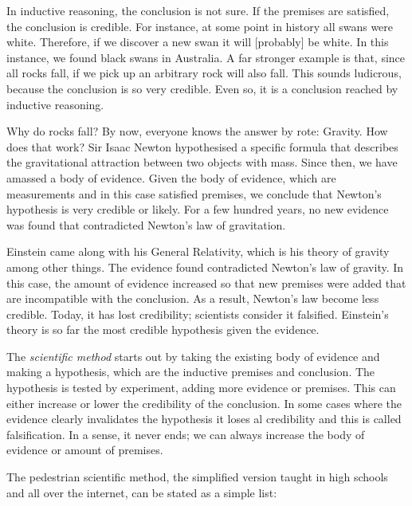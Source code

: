\begin{multicols}{2}
In inductive reasoning, the conclusion is not sure. If the premises are satisfied, the conclusion is credible. For instance, at some point in
history all swans were white. Therefore, if we discover a new swan it will [probably] be white. In this instance, we found black swans in Australia.
A far stronger example is that, since all rocks fall, if we pick up an arbitrary rock will also fall. This sounds ludicrous, because the conclusion
is so very credible. Even so, it is a conclusion reached by inductive reasoning.


Why do rocks fall? By now, everyone knows the answer by rote: Gravity. How does that work? Sir Isaac Newton hypothesised a specific formula that
describes the gravitational attraction between two objects with mass. Since then, we have amassed a body of evidence. Given the body of evidence,
which are measurements and in this case satisfied premises, we conclude that Newton's hypothesis is very credible or likely. For a few hundred
years, no new evidence was found that contradicted Newton's law of gravitation.


Einstein came along with his General Relativity, which is his theory of gravity among other things. The evidence found contradicted Newton's law
of gravity. In this case, the amount of evidence increased so that new premises were added that are incompatible with the conclusion. As a result,
Newton's law become less credible. Today, it has lost credibility; scientists consider it falsified. Einstein's theory is so far the most credible
hypothesis given the evidence.


The \emph{scientific method} starts out by taking the existing body of evidence and making a hypothesis, which are the inductive premises and
conclusion. The hypothesis is tested by experiment, adding more evidence or premises. This can either increase or lower the credibility of the 
conclusion. In some cases where the evidence clearly invalidates the hypothesis it loses al credibility and this is called falsification. In a sense,
it never ends; we can always increase the body of evidence or amount of premises.


The pedestrian scientific method, the simplified version taught in high schools and all over the internet, can be stated as a simple list:
 


\end{multicols}
